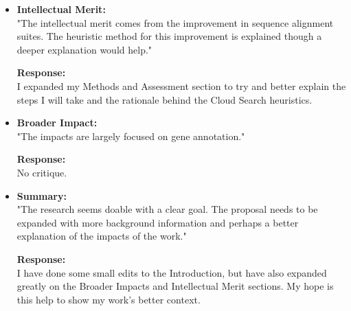 \documentclass{article}
\begin{document}
	\begin{itemize}
		\item 
			\textbf{Intellectual Merit:} \\
			"The intellectual merit comes from the improvement in sequence alignment suites. The heuristic method for this improvement is explained though a deeper explanation would help."
			
			\textbf{Response:} \\
			I expanded my Methods and Assessment section to try and better explain the steps I will take and the rationale behind the Cloud Search heuristics.
		
		\item 
			\textbf{Broader Impact:} \\
			"The impacts are largely focused on gene annotation."
			
			\textbf{Response:} \\
			No critique.
		
		\item
			\textbf{Summary:} \\
			"The research seems doable with a clear goal. The proposal needs to be expanded with more background information and perhaps a better explanation of the impacts of the work."
			
			\textbf{Response:} \\
			I have done some small edits to the Introduction, but have also expanded greatly on the Broader Impacts and Intellectual Merit sections.  My hope is this help to show my work's better context.
		
	\end{itemize}
	

	
\end{document}

